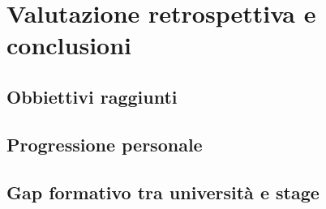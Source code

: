 
\chapter{Valutazione retrospettiva e conclusioni}
\label{cap:conclusioni}


\section{Obbiettivi raggiunti}

\section{Progressione personale}

\section{Gap formativo tra università e stage}

%




